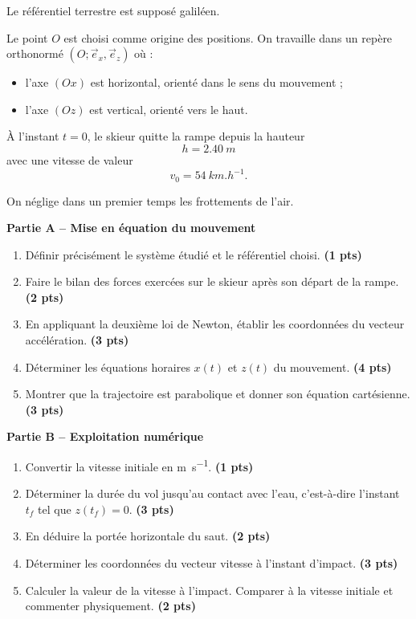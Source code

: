 \documentclass[11pt,a4paper]{article}
\newcommand{\e}[1]{\vec{e}_{#1}}
\newcommand{\bareme}[1]{\hfill{\color{blue!70!black}\textbf{(#1 pts)}}}
\begin{document}
Le référentiel terrestre est supposé galiléen.

Le point $O$ est choisi comme origine des positions. On travaille dans un repère orthonormé $(O;\e{x},\e{z})$ où :
\begin{itemize}[leftmargin=0.7cm]
    \item l’axe $(Ox)$ est horizontal, orienté dans le sens du mouvement ;
    \item l’axe $(Oz)$ est vertical, orienté vers le haut.
\end{itemize}

À l’instant $t=0$, le skieur quitte la rampe depuis la hauteur
\[
h=\SI{2.40}{m}
\]
avec une vitesse de valeur
\[
v_0=\SI{54}{km.h^{-1}}.
\]

On néglige dans un premier temps les frottements de l’air.

\medskip

\textbf{Partie A -- Mise en équation du mouvement}

\begin{enumerate}[label=\textbf{A.\arabic*.}, leftmargin=0.9cm]
    \item Définir précisément le système étudié et le référentiel choisi. \bareme{1}
    \item Faire le bilan des forces exercées sur le skieur après son départ de la rampe. \bareme{2}
    \item En appliquant la deuxième loi de Newton, établir les coordonnées du vecteur accélération. \bareme{3}
    \item Déterminer les équations horaires $x(t)$ et $z(t)$ du mouvement. \bareme{4}
    \item Montrer que la trajectoire est parabolique et donner son équation cartésienne. \bareme{3}
\end{enumerate}

\medskip

\textbf{Partie B -- Exploitation numérique}

\begin{enumerate}[label=\textbf{B.\arabic*.}, leftmargin=0.9cm]
    \item Convertir la vitesse initiale en \si{m.s^{-1}}. \bareme{1}
    \item Déterminer la durée du vol jusqu’au contact avec l’eau, c’est-à-dire l’instant $t_f$ tel que $z(t_f)=0$. \bareme{3}
    \item En déduire la portée horizontale du saut. \bareme{2}
    \item Déterminer les coordonnées du vecteur vitesse à l’instant d’impact. \bareme{3}
    \item Calculer la valeur de la vitesse à l’impact. Comparer à la vitesse initiale et commenter physiquement. \bareme{2}
\end{enumerate}
\end{document}
